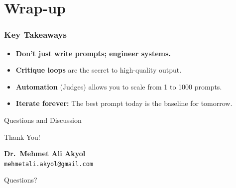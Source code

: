 \documentclass{beamer}
\begin{document}
\section{Wrap-up}

\begin{frame}
    \frametitle{Key Takeaways}
    \begin{itemize}
        \item \textbf{Don't just write prompts; engineer systems.}
        \item \textbf{Critique loops} are the secret to high-quality output.
        \item \textbf{Automation} (Judges) allows you to scale from 1 to 1000 prompts.
        \item \textbf{Iterate forever:} The best prompt today is the baseline for tomorrow.
    \end{itemize}
\end{frame}

\begin{frame}{Questions and Discussion}
    \begin{center}
    {\Huge Thank You!}
    \vspace{1cm}

        \textbf{Dr.\ Mehmet Ali Akyol}\\
        \texttt{mehmetali.akyol@gmail.com}
    \vspace{1cm}

    {\large Questions?}
    \end{center}
\end{frame}
\end{document}
